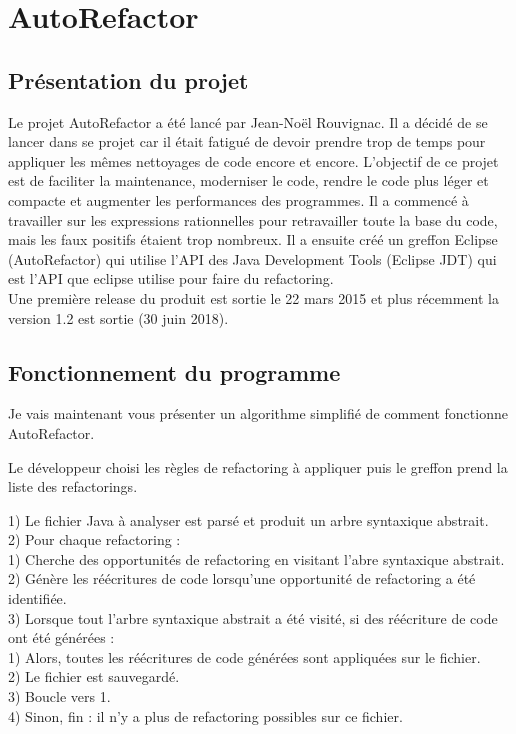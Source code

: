\documentclass[a4paper,twoside,12pt,openright]{report}
\begin{document}
\section{AutoRefactor}
\subsection{Présentation du projet}
Le projet AutoRefactor a été lancé par Jean-Noël Rouvignac. Il a décidé de se lancer dans se projet car il était fatigué de devoir prendre trop de temps pour appliquer les mêmes nettoyages de code encore et encore. L'objectif de ce projet est de faciliter la maintenance, moderniser le code, rendre le code plus léger et compacte et augmenter les performances des programmes. Il a commencé à travailler sur les expressions rationnelles pour retravailler toute la base du code, mais les faux positifs étaient trop nombreux.\cite{ref7} Il a ensuite créé un greffon Eclipse (AutoRefactor) qui utilise  l'API des Java Development Tools (Eclipse JDT) qui est l'API que eclipse utilise pour faire du refactoring.\\
Une première release du produit est sortie le 22 mars 2015 et plus récemment la version 1.2 est sortie (30 juin 2018).\\

\subsection{Fonctionnement du programme}
Je vais maintenant vous présenter un algorithme simplifié de comment fonctionne AutoRefactor.

Le développeur choisi les règles de refactoring à appliquer puis le greffon prend la liste des refactorings.

1) Le fichier Java à analyser est parsé et produit un arbre syntaxique abstrait.\\

2) Pour chaque refactoring :\\
\tabto{0.8cm} 1) Cherche des opportunités de refactoring en visitant l'abre syntaxique abstrait.\\
\tabto{0.8cm} 2) Génère les réécritures de code lorsqu'une  opportunité de refactoring a été identifiée.\\

3) Lorsque tout l'arbre syntaxique abstrait a été visité, si des réécriture de code ont été générées :\\
\tabto{0.8cm} 1) Alors, toutes les réécritures de code générées sont appliquées sur le fichier.\\
\tabto{0.8cm} 2) Le fichier est sauvegardé.\\
\tabto{0.8cm} 3) Boucle vers 1.\\
\tabto{0.8cm} 4) Sinon, fin : il n'y a plus de refactoring possibles sur ce fichier.\\
\end{document}

